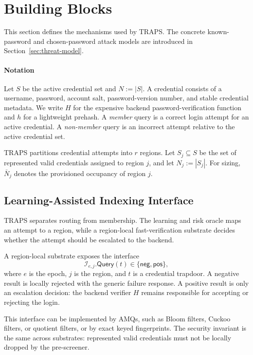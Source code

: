 \section{Building Blocks}
\label{sec:blocks}

This section defines the mechanisms used by TRAPS. The concrete known-password and chosen-password attack models are introduced in Section~\ref{sec:threat-model}.

\paragraph{Notation}
Let \(S\) be the active credential set and \(N:=|S|\). A credential consists of a username, password, account salt, password-version number, and stable credential metadata. We write \(H\) for the expensive backend password-verification function and \(h\) for a lightweight prehash. A \emph{member} query is a correct login attempt for an active credential. A \emph{non-member} query is an incorrect attempt relative to the active credential set.

TRAPS partitions credential attempts into \(r\) regions. Let \(S_j\subseteq S\) be the set of represented valid credentials assigned to region \(j\), and let \(N_j:=|S_j|\). For sizing, \(\bar N_j\) denotes the provisioned occupancy of region \(j\).

\subsection{Learning-Assisted Indexing Interface}

TRAPS separates routing from membership. The learning and risk oracle maps an attempt to a region, while a region-local fast-verification substrate decides whether the attempt should be escalated to the backend.

A region-local substrate exposes the interface
\[
\mathcal I_{e,j}.\mathsf{Query}(t)\in\{\mathsf{neg},\mathsf{pos}\},
\]
where \(e\) is the epoch, \(j\) is the region, and \(t\) is a credential trapdoor. A negative result is locally rejected with the generic failure response. A positive result is only an escalation decision: the backend verifier \(H\) remains responsible for accepting or rejecting the login.

This interface can be implemented by AMQs, such as Bloom filters, Cuckoo filters, or quotient filters, or by exact keyed fingerprints. The security invariant is the same across substrates: represented valid credentials must not be locally dropped by the pre-screener.

